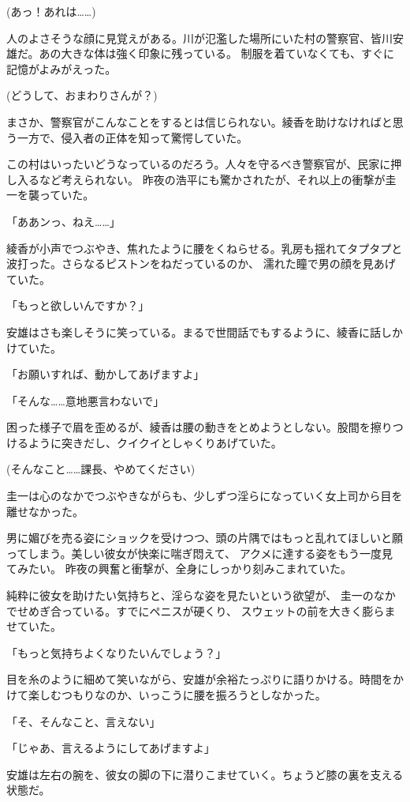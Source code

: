 ﻿\documentclass[
    book,tate,
    line_length=30zw,
    jafontsize=12pt,
    paper=b5j,
    landscape,
    ]{jlreq}
\begin{document}
(あっ！あれは……)

人のよさそうな顔に見覚えがある。川が氾濫した場所にいた村の警察官、皆川安雄だ。あの大きな体は強く印象に残っている。
制服を着ていなくても、すぐに記憶がよみがえった。

(どうして、おまわりさんが？)

まさか、警察官がこんなことをするとは信じられない。綾香を助けなければと思う一方で、侵入者の正体を知って驚愕していた。

この村はいったいどうなっているのだろう。人々を守るべき警察官が、民家に押し入るなど考えられない。
昨夜の浩平にも驚かされたが、それ以上の衝撃が圭一を襲っていた。

「ああンっ、ねえ……」

綾香が小声でつぶやき、焦れたように腰をくねらせる。乳房も揺れてタプタプと波打った。さらなるピストンをねだっているのか、
濡れた瞳で男の顔を見あげていた。

「もっと欲しいんですか？」

安雄はさも楽しそうに笑っている。まるで世間話でもするように、綾香に話しかけていた。

「お願いすれば、動かしてあげますよ」

「そんな……意地悪言わないで」

困った様子で眉を歪めるが、綾香は腰の動きをとめようとしない。股間を擦りつけるように突きだし、クイクイとしゃくりあげていた。

(そんなこと……課長、やめてください)

圭一は心のなかでつぶやきながらも、少しずつ淫らになっていく女上司から目を離せなかった。

男に媚びを売る姿にショックを受けつつ、頭の片隅ではもっと乱れてほしいと願ってしまう。美しい彼女が快楽に喘ぎ悶えて、
アクメに達する姿をもう一度見てみたい。 昨夜の興奮と衝撃が、全身にしっかり刻みこまれていた。

純粋に彼女を助けたい気持ちと、淫らな姿を見たいという欲望が、 圭一のなかでせめぎ合っている。すでにペニスが硬くり、
スウェットの前を大きく膨らませていた。

「もっと気持ちよくなりたいんでしょう？」

目を糸のように細めて笑いながら、安雄が余裕たっぷりに語りかける。時間をかけて楽しむつもりなのか、いっこうに腰を振ろうとしなかった。

「そ、そんなこと、言えない」

「じゃあ、言えるようにしてあげますよ」

安雄は左右の腕を、彼女の脚の下に潜りこませていく。ちょうど膝の裏を支える状態だ。
\end{document}
